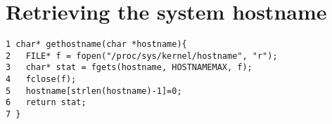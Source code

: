 \section{Retrieving the system hostname}
\label{gethostname}
\begin{verbatim}
1 char* gethostname(char *hostname){
2   FILE* f = fopen("/proc/sys/kernel/hostname", "r");
3   char* stat = fgets(hostname, HOSTNAMEMAX, f);
4   fclose(f);
5   hostname[strlen(hostname)-1]=0;
6   return stat;
7 }
\end{verbatim}
